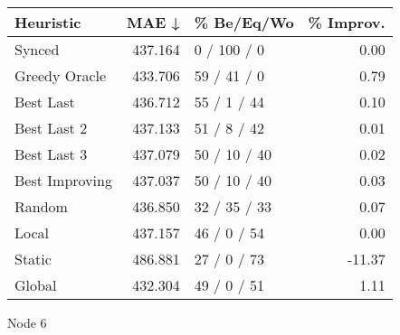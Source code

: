 \begin{tabular}{lrlr}
\toprule
\textbf{Heuristic} & \textbf{MAE ↓} & \textbf{\% Be/Eq/Wo} & \textbf{\% Improv.} \\
\midrule
            Synced &        437.164 &          0 / 100 / 0 &                0.00 \\
     Greedy Oracle &        433.706 &          59 / 41 / 0 &                0.79 \\
         Best Last &        436.712 &          55 / 1 / 44 &                0.10 \\
       Best Last 2 &        437.133 &          51 / 8 / 42 &                0.01 \\
       Best Last 3 &        437.079 &         50 / 10 / 40 &                0.02 \\
    Best Improving &        437.037 &         50 / 10 / 40 &                0.03 \\
            Random &        436.850 &         32 / 35 / 33 &                0.07 \\
             Local &        437.157 &          46 / 0 / 54 &                0.00 \\
            Static &        486.881 &          27 / 0 / 73 &              -11.37 \\
            Global &        432.304 &          49 / 0 / 51 &                1.11 \\
\bottomrule
\end{tabular}
\caption{Node 6}
\label{tab:non_lr05_le1_bs4_6}
